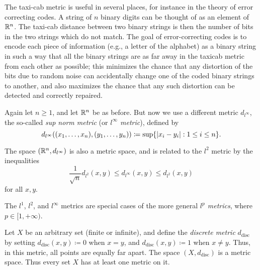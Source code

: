 \begin{rmk}\label{1.1.8}
  The taxi-cab metric is useful in several places, for instance in the theory of error correcting codes.
  A string of \(n\) binary digits can be thought of as an element of \(\mathbb{R}^n\).
  The taxi-cab distance between two binary strings is then the number of bits in the two strings which do not match.
  The goal of error-correcting codes is to encode each piece of information (e.g., a letter of the alphabet) as a binary string in such a way that all the binary strings are as far away in the taxicab metric from each other as possible;
  this minimizes the chance that any distortion of the bits due to random noise can accidentally change one of the coded binary strings to another, and also maximizes the chance that any such distortion can be detected and correctly repaired.
\end{rmk}

\begin{eg}\label{1.1.9}
  Again let \(n \geq 1\), and let \(\mathbb{R}^n\) be as before.
  But now we use a different metric \(d_{l^\infty}\), the so-called \emph{sup norm metric} (or \emph{\(l^\infty\) metric}), defined by
  \[
    d_{l^\infty} ((x_1, \dots, x_n), (y_1, \dots, y_n)) \coloneqq \sup\{\left\lvert x_i - y_i\right\rvert : 1 \leq i \leq n\}.
  \]
\end{eg}

\begin{note}
  The space \((\mathbb{R}^n, d_{l^\infty})\) is also a metric space, and is related to the \(l^2\) metric by the inequalities
  \[
    \dfrac{1}{\sqrt{n}} d_{l^2}(x, y) \leq d_{l^\infty}(x, y) \leq d_{l^2}(x, y)
  \]
  for all \(x, y\).
\end{note}

\begin{rmk}\label{1.1.10}
  The \(l^1\), \(l^2\), and \(l^\infty\) metrics are special cases of the more general \emph{\(l^p\) metrics}, where \(p \in [1, +\infty)\).
\end{rmk}

\begin{eg}\label{1.1.11}
  Let \(X\) be an arbitrary set (finite or infinite), and define the \emph{discrete metric} \(d_{\text{disc}}\) by setting \(d_{\text{disc}}(x, y) \coloneqq 0\) when \(x = y\), and \(d_{\text{disc}}(x, y) \coloneqq 1\) when \(x \neq y\).
  Thus, in this metric, all points are equally far apart.
  The space \((X, d_{\text{disc}})\) is a metric space.
  Thus every set \(X\) has at least one metric on it.
\end{eg}

